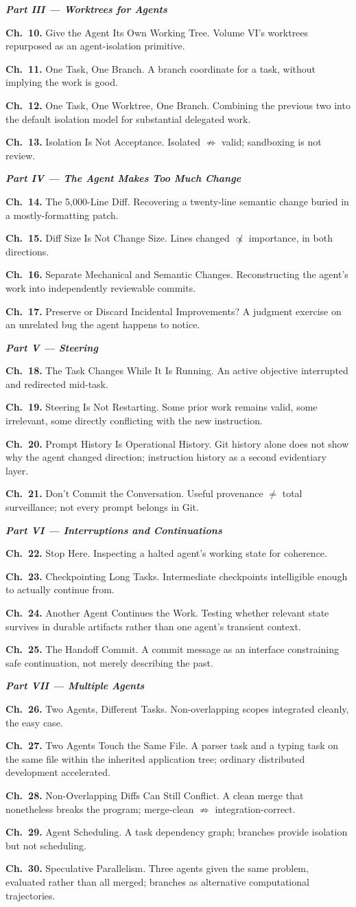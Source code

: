 \documentclass[11pt]{book}
\newcommand{\chapentry}[2]{\noindent\textbf{Ch.~#1.} #2\par\smallskip}
\newcommand{\partheading}[1]{\bigskip\noindent\textbf{\textit{#1}}\smallskip\par}
\begin{document}
\partheading{Part III --- Worktrees for Agents}
\chapentry{10}{Give the Agent Its Own Working Tree. Volume VI's worktrees repurposed as an agent-isolation primitive.}
\chapentry{11}{One Task, One Branch. A branch coordinate for a task, without implying the work is good.}
\chapentry{12}{One Task, One Worktree, One Branch. Combining the previous two into the default isolation model for substantial delegated work.}
\chapentry{13}{Isolation Is Not Acceptance. Isolated $\not\Rightarrow$ valid; sandboxing is not review.}

\partheading{Part IV --- The Agent Makes Too Much Change}
\chapentry{14}{The 5,000-Line Diff. Recovering a twenty-line semantic change buried in a mostly-formatting patch.}
\chapentry{15}{Diff Size Is Not Change Size. Lines changed $\not\propto$ importance, in both directions.}
\chapentry{16}{Separate Mechanical and Semantic Changes. Reconstructing the agent's work into independently reviewable commits.}
\chapentry{17}{Preserve or Discard Incidental Improvements? A judgment exercise on an unrelated bug the agent happens to notice.}

\partheading{Part V --- Steering}
\chapentry{18}{The Task Changes While It Is Running. An active objective interrupted and redirected mid-task.}
\chapentry{19}{Steering Is Not Restarting. Some prior work remains valid, some irrelevant, some directly conflicting with the new instruction.}
\chapentry{20}{Prompt History Is Operational History. Git history alone does not show why the agent changed direction; instruction history as a second evidentiary layer.}
\chapentry{21}{Don't Commit the Conversation. Useful provenance $\neq$ total surveillance; not every prompt belongs in Git.}

\partheading{Part VI --- Interruptions and Continuations}
\chapentry{22}{Stop Here. Inspecting a halted agent's working state for coherence.}
\chapentry{23}{Checkpointing Long Tasks. Intermediate checkpoints intelligible enough to actually continue from.}
\chapentry{24}{Another Agent Continues the Work. Testing whether relevant state survives in durable artifacts rather than one agent's transient context.}
\chapentry{25}{The Handoff Commit. A commit message as an interface constraining safe continuation, not merely describing the past.}

\partheading{Part VII --- Multiple Agents}
\chapentry{26}{Two Agents, Different Tasks. Non-overlapping scopes integrated cleanly, the easy case.}
\chapentry{27}{Two Agents Touch the Same File. A parser task and a typing task on the same file within the inherited application tree; ordinary distributed development accelerated.}
\chapentry{28}{Non-Overlapping Diffs Can Still Conflict. A clean merge that nonetheless breaks the program; merge-clean $\not\Rightarrow$ integration-correct.}
\chapentry{29}{Agent Scheduling. A task dependency graph; branches provide isolation but not scheduling.}
\chapentry{30}{Speculative Parallelism. Three agents given the same problem, evaluated rather than all merged; branches as alternative computational trajectories.}
\end{document}
